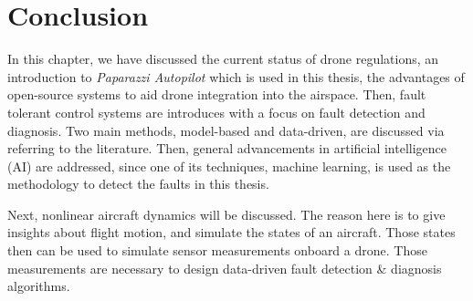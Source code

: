 \section{Conclusion}

In this chapter, we have discussed the current status of drone regulations, an introduction to \emph{Paparazzi Autopilot} which is used in this thesis, the advantages of open-source systems to aid drone integration into the airspace. Then, fault tolerant control systems are introduces with a focus on fault detection and diagnosis. Two main methods, model-based and data-driven, are discussed via referring to the literature. Then, general advancements in artificial intelligence (AI) are addressed, since one of its techniques, machine learning, is used as the methodology to detect the faults in this thesis. 

Next, nonlinear aircraft dynamics will be discussed. The reason here is to give insights about flight motion, and simulate the states of an aircraft. Those states then can be used to simulate sensor measurements onboard a drone. Those measurements are necessary to design data-driven fault detection \& diagnosis algorithms.
